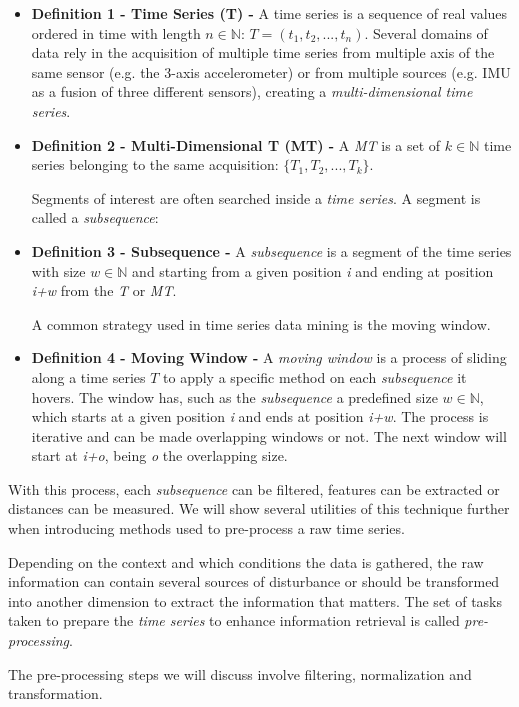 \begin{itemize}
    \item \textbf{Definition 1 - Time Series (T) - } A time series is a sequence of real values ordered in time with length $n \in \mathbb{N}$: $T = (t_1, t_2, ..., t_n)$.
    Several domains of data rely in the acquisition of multiple time series from multiple axis of the same sensor (e.g. the 3-axis accelerometer) or from multiple sources (e.g. IMU as a fusion of three different sensors), creating a \textit{multi-dimensional time series}.
    
    \item \textbf{Definition 2 - Multi-Dimensional T (MT) - } A \textit{MT} is a set of $k \in \mathbb{N}$ time series belonging to the same acquisition: $\{T_1, T_2, ..., T_k\}$.

Segments of interest are often searched inside a \textit{time series}. A segment is called a \textit{subsequence}:
    
    \item \textbf{Definition 3 - Subsequence - } A \textit{subsequence} is a segment of the time series with size $w \in \mathbb{N}$ and starting from a given position \textit{i} and ending at position \textit{i+w} from the \textit{T} or \textit{MT}.
    
A common strategy used in time series data mining is  the moving window. 

    \item \textbf{Definition 4 - Moving Window - } A \textit{moving window} is a process of sliding along a time series $T$ to apply a specific method on each \textit{subsequence} it hovers. The window has, such as the \textit{subsequence} a predefined size $w \in \mathbb{N}$, which starts at a given position \textit{i} and ends at position \textit{i+w}. The process is iterative and can be made overlapping windows or not. The next window will start at \textit{i+o}, being \textit{o} the overlapping size.

\end{itemize}

With this process, each \textit{subsequence} can be filtered, features can be extracted or distances can be measured. We will show several utilities of this technique further when introducing methods used to pre-process a raw time series.
\par
Depending on the context and which conditions the data is gathered, the raw information can contain several sources of disturbance or should be transformed into another dimension to extract the information that matters. The set of tasks taken to prepare the \textit{time series} to enhance information retrieval is called \textit{pre-processing}.
\par
The pre-processing steps we will discuss involve filtering, normalization and transformation.

